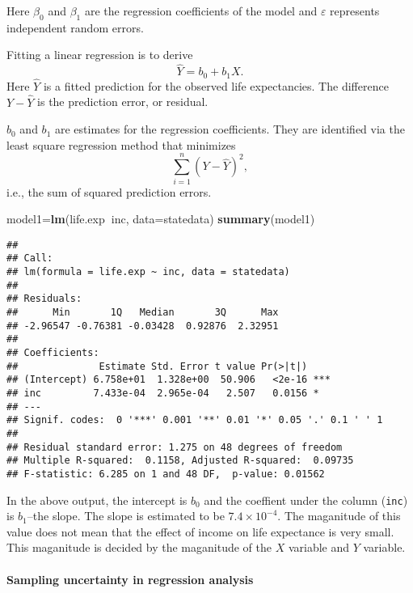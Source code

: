 \documentclass[]{article}
\newenvironment{Shaded}{\begin{snugshade}}{\end{snugshade}}
\newcommand{\KeywordTok}[1]{\textcolor[rgb]{0.13,0.29,0.53}{\textbf{#1}}}
\newcommand{\DataTypeTok}[1]{\textcolor[rgb]{0.13,0.29,0.53}{#1}}
\newcommand{\OperatorTok}[1]{\textcolor[rgb]{0.81,0.36,0.00}{\textbf{#1}}}
\newcommand{\NormalTok}[1]{#1}
\let\oldparagraph\paragraph
\renewcommand{\paragraph}[1]{\oldparagraph{#1}\mbox{}}
\begin{document}
Here \(\beta_0\) and \(\beta_1\) are the regression coefficients of the
model and \(\varepsilon\) represents independent random errors.

Fitting a linear regression is to derive \[\hat{Y} = b_0 + b_1 X.\] Here
\(\hat{Y}\) is a fitted prediction for the observed life expectancies.
The difference \(Y - \hat{Y}\) is the prediction error, or residual.

\(b_0\) and \(b_1\) are estimates for the regression coefficients. They
are identified via the least square regression method that minimizes
\[\sum_{i=1}^n (Y - \hat{Y})^2,\] i.e., the sum of squared prediction
errors.

\begin{Shaded}
\begin{Highlighting}[]
\NormalTok{model1=}\KeywordTok{lm}\NormalTok{(life.exp}\OperatorTok{~}\NormalTok{inc, }\DataTypeTok{data=}\NormalTok{statedata)}
\KeywordTok{summary}\NormalTok{(model1)}
\end{Highlighting}
\end{Shaded}

\begin{verbatim}
## 
## Call:
## lm(formula = life.exp ~ inc, data = statedata)
## 
## Residuals:
##      Min       1Q   Median       3Q      Max 
## -2.96547 -0.76381 -0.03428  0.92876  2.32951 
## 
## Coefficients:
##              Estimate Std. Error t value Pr(>|t|)    
## (Intercept) 6.758e+01  1.328e+00  50.906   <2e-16 ***
## inc         7.433e-04  2.965e-04   2.507   0.0156 *  
## ---
## Signif. codes:  0 '***' 0.001 '**' 0.01 '*' 0.05 '.' 0.1 ' ' 1
## 
## Residual standard error: 1.275 on 48 degrees of freedom
## Multiple R-squared:  0.1158, Adjusted R-squared:  0.09735 
## F-statistic: 6.285 on 1 and 48 DF,  p-value: 0.01562
\end{verbatim}

In the above output, the intercept is \(b_0\) and the coeffient under
the column (\texttt{inc}) is \(b_1\)--the slope. The slope is estimated
to be \(7.4\times 10^{-4}\). The maganitude of this value does not mean
that the effect of income on life expectance is very small. This
maganitude is decided by the maganitude of the \(X\) variable and \(Y\)
variable.

\paragraph{Sampling uncertainty in regression
analysis}\label{sampling-uncertainty-in-regression-analysis}
\end{document}
